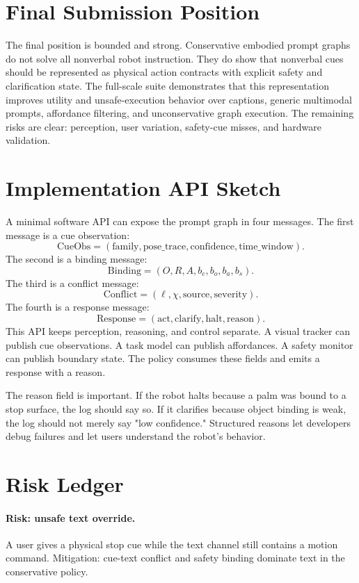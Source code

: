 \documentclass{article}
\begin{document}
\section{Final Submission Position}

The final position is bounded and strong. Conservative embodied prompt graphs do not solve all nonverbal robot instruction. They do show that nonverbal cues should be represented as physical action contracts with explicit safety and clarification state. The full-scale suite demonstrates that this representation improves utility and unsafe-execution behavior over captions, generic multimodal prompts, affordance filtering, and unconservative graph execution. The remaining risks are clear: perception, user variation, safety-cue misses, and hardware validation.

\section{Implementation API Sketch}

A minimal software API can expose the prompt graph in four messages. The first message is a cue observation:
\[
\mathrm{CueObs}=(\mathrm{family}, \mathrm{pose\_trace}, \mathrm{confidence}, \mathrm{time\_window}).
\]
The second is a binding message:
\[
\mathrm{Binding}=(O, R, A, b_c, b_o, b_a, b_s).
\]
The third is a conflict message:
\[
\mathrm{Conflict}=(\ell, \chi, \mathrm{source}, \mathrm{severity}).
\]
The fourth is a response message:
\[
\mathrm{Response}=(\mathrm{act}, \mathrm{clarify}, \mathrm{halt}, \mathrm{reason}).
\]
This API keeps perception, reasoning, and control separate. A visual tracker can publish cue observations. A task model can publish affordances. A safety monitor can publish boundary state. The policy consumes these fields and emits a response with a reason.

The reason field is important. If the robot halts because a palm was bound to a stop surface, the log should say so. If it clarifies because object binding is weak, the log should not merely say "low confidence." Structured reasons let developers debug failures and let users understand the robot's behavior.

\section{Risk Ledger}

\paragraph{Risk: unsafe text override.}
A user gives a physical stop cue while the text channel still contains a motion command. Mitigation: cue-text conflict and safety binding dominate text in the conservative policy.
\end{document}
